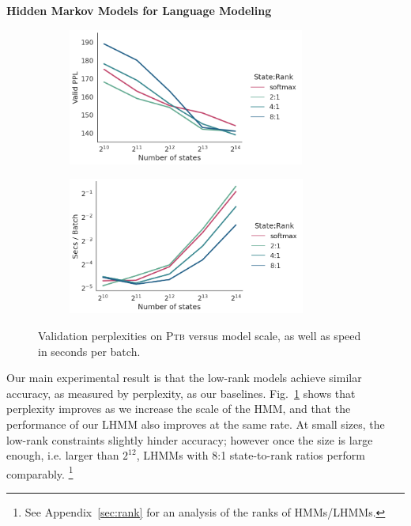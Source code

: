 \documentclass{article}
\begin{document}
\textbf{Hidden Markov Models for Language Modeling}
\begin{figure}[t]
\begin{subfigure}[t]{0.40\textwidth}
\includegraphics[height=4.5cm,trim={0 0 5cm 0}, clip]{imgs/hmm/lhmm-states-features-dropout.png}
\end{subfigure}
\hspace{1.5em}
\begin{subfigure}[t]{0.50\textwidth}
\includegraphics[height=4.5cm]{imgs/hmm/lhmm-states-features-speed-log.png}
\end{subfigure}
\caption{
\label{fig:hmm-ppl-features-dropout}
Validation perplexities on \textsc{Ptb} versus model scale, as well as speed in seconds per batch.
}
\end{figure}
Our main experimental result is that the low-rank models achieve similar accuracy,
as measured by perplexity, as our baselines.
Fig.~\ref{fig:hmm-ppl-features-dropout} shows that perplexity improves as we increase the scale of the HMM, and
that the performance of our LHMM also improves at the same rate.
At small sizes, the low-rank constraints slightly hinder accuracy; however
once the size is large enough, i.e. larger than $2^{12}$, LHMMs with 8:1 state-to-rank ratios perform comparably. \footnote{
See Appendix~\ref{sec:rank} for an analysis of the ranks of HMMs/LHMMs.}
\end{document}
